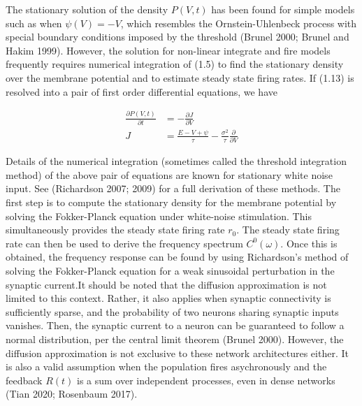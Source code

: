 \documentclass{ucetd}
\begin{document}
The stationary solution of the density $P(V,t)$ has been found for simple models such as when $\psi(V) = -V$, which resembles the Ornstein-Uhlenbeck process with special boundary conditions imposed by the threshold (Brunel 2000; Brunel and Hakim 1999). However, the solution for non-linear integrate and fire models frequently requires numerical integration of (1.5) to find the stationary density over the membrane potential and to estimate steady state firing rates. If (1.13) is resolved into a pair of first order differential equations, we have

\begin{align*}
\frac{\partial P(V,t)}{\partial t} &= -\frac{\partial J}{\partial V}\\
J &= \frac{E-V+\psi}{\tau} - \frac{\sigma^{2}}{\tau}\frac{\partial}{\partial V}
\end{align*}

Details of the numerical integration (sometimes called the threshold integration method) of the above pair of equations are known for stationary white noise input. See (Richardson 2007; 2009) for a full derivation of these methods. The first step is to compute the stationary density for the membrane potential by solving the Fokker-Planck equation under white-noise stimulation. This simultaneously provides the steady state firing rate $r_{0}$. The steady state firing rate can then be used to derive the frequency spectrum $C^{0}(\omega)$. Once this is obtained, the frequency response can be found by using Richardson's method of solving the Fokker-Planck equation for a weak sinusoidal perturbation in the synaptic current.It should be noted that the diffusion approximation is not limited to this context. Rather, it also applies when synaptic connectivity is sufficiently sparse, and the probability of two neurons sharing synaptic inputs vanishes. Then, the synaptic current to a neuron can be guaranteed to follow a normal distribution, per the central limit theorem (Brunel 2000). However, the diffusion approximation is not exclusive to these network architectures either. It is also a valid assumption when the population fires asychronously and the feedback $R(t)$ is a sum over independent processes, even in dense networks (Tian 2020; Rosenbaum 2017).
\end{document}
